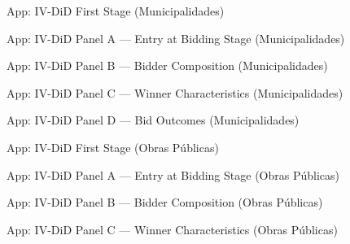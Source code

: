 \documentclass[10pt,aspectratio=169]{beamer}
\begin{document}
\begin{frame}{App: IV-DiD First Stage (Municipalidades)}
\small
\medskip

\end{frame}


\begin{frame}{App: IV-DiD Panel A --- Entry at Bidding Stage (Municipalidades)}
\small
\medskip

\end{frame}


\begin{frame}{App: IV-DiD Panel B --- Bidder Composition (Municipalidades)}
\small
\medskip

\end{frame}


\begin{frame}{App: IV-DiD Panel C --- Winner Characteristics (Municipalidades)}
\small
\medskip

\end{frame}


\begin{frame}{App: IV-DiD Panel D --- Bid Outcomes (Municipalidades)}
\small
\medskip

\end{frame}



\begin{frame}{App: IV-DiD First Stage (Obras Públicas)}
\small
\medskip

\end{frame}


\begin{frame}{App: IV-DiD Panel A --- Entry at Bidding Stage (Obras Públicas)}
\small
\medskip

\end{frame}


\begin{frame}{App: IV-DiD Panel B --- Bidder Composition (Obras Públicas)}
\small
\medskip

\end{frame}


\begin{frame}{App: IV-DiD Panel C --- Winner Characteristics (Obras Públicas)}
\small
\medskip

\end{frame}
\end{document}
